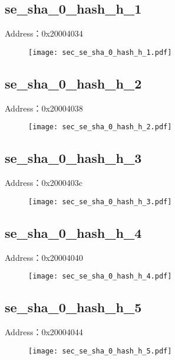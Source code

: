 \subsection{se\_sha\_0\_hash\_h\_1}
\label{sec-se-sha-0-hash-h-1}
Address：0x20004034
 \begin{figure}[H]
\texttt{[image: sec\_se\_sha\_0\_hash\_h\_1.pdf]}
\end{figure}

\subsection{se\_sha\_0\_hash\_h\_2}
\label{sec-se-sha-0-hash-h-2}
Address：0x20004038
 \begin{figure}[H]
\texttt{[image: sec\_se\_sha\_0\_hash\_h\_2.pdf]}
\end{figure}

\subsection{se\_sha\_0\_hash\_h\_3}
\label{sec-se-sha-0-hash-h-3}
Address：0x2000403c
 \begin{figure}[H]
\texttt{[image: sec\_se\_sha\_0\_hash\_h\_3.pdf]}
\end{figure}

\subsection{se\_sha\_0\_hash\_h\_4}
\label{sec-se-sha-0-hash-h-4}
Address：0x20004040
 \begin{figure}[H]
\texttt{[image: sec\_se\_sha\_0\_hash\_h\_4.pdf]}
\end{figure}

\subsection{se\_sha\_0\_hash\_h\_5}
\label{sec-se-sha-0-hash-h-5}
Address：0x20004044
 \begin{figure}[H]
\texttt{[image: sec\_se\_sha\_0\_hash\_h\_5.pdf]}
\end{figure}

